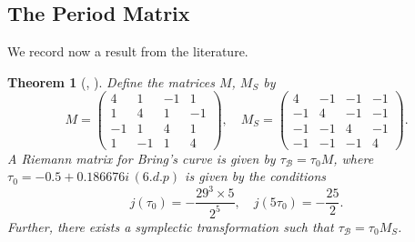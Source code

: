 \documentclass{amsart}
\newtheorem{theorem}{Theorem}[section]
\begin{document}
\subsection{The Period Matrix}\label{subsec: period matrix}
We record now a result from the literature.
\begin{theorem}[\cite{Riera1992}, \cite{Gonzalez2000}]
Define the matrices $M$, $M_S$ by
\[
M =  \begin{pmatrix}
4 & 1 & -1 & 1 \\ 1 & 4 & 1 & -1 \\ -1 & 1 & 4 & 1 \\ 1 & -1 & 1 & 4
\end{pmatrix}, \quad
M_S =  \begin{pmatrix}
4 & -1 & -1 & -1 \\ -1 & 4 & -1 & -1 \\ -1 & -1 & 4 & -1 \\ -1 & -1 & -1 & 4
\end{pmatrix}.
\]
A Riemann matrix for Bring's curve is given by
$\tau_{\mathcal{B}} = \tau_0 M$, where $\tau_0 = -0.5+0.186676i \, (6.d.p)$ is given by the conditions 
\[
j(\tau_0) = - \frac{29^3 \times 5}{2^5}, \quad j(5\tau_0) = -\frac{25}{2} .
\]
Further, there exists a symplectic transformation such that $\tau_{\mathcal{B}} = \tau_0 M_S$.
\end{theorem}
\end{document}
